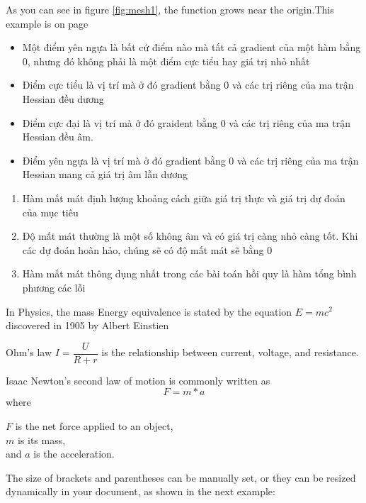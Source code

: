 \documentclass[12pt, letterpaper]{article}
\begin{document}
\newpage 
As you can see in figure \ref{fig:mesh1}, the function grows near the origin.This example is on page \pageref{fig:mesh1}   
    

\begin{itemize}
    \item Một điểm yên ngựa là bất cứ điểm nào mà tất cả gradient của một hàm bằng 0, nhưng đó không phải là một điểm cực tiểu hay giá trị nhỏ nhất
    \item Điểm cực tiểu là vị trí mà ở đó gradient bằng 0 và các trị riêng của ma trận Hessian đều dương
    \item Điểm cực đại là vị trí mà ở đó graident bằng 0 và các trị riêng của ma trận Hessian đều âm.
    \item Điểm yên ngựa là vị trí mà ở đó gradient bằng 0 và các trị riêng của ma trận Hessian mang cả giá trị âm lẫn dương


\end{itemize}

\begin{enumerate}
    \item Hàm mất mát định lượng khoảng cách giữa giá trị thực và giá trị dự đoán của mục tiêu
    \item  Độ mất mát thường là một số không âm và có giá trị càng nhỏ càng tốt. Khi các dự đoán hoàn hảo, chúng sẽ có độ mất mát sẽ bằng 0
    \item Hàm mất mát thông dụng nhất trong các bài toán hồi quy là hàm tổng bình phương các lỗi
\end{enumerate}

\newpage
In Physics, the mass Energy equivalence is stated by the equation $E=mc^2$ discovered in 1905 by Albert Einstien

\bigskip 


Ohm's law $ I = \dfrac{U}{R + r}$ is the relationship between current, voltage, and resistance.



\bigskip
Isaac Newton’s second law of motion is commonly written as 
\[ F=m*a\] where 

\begin{flushleft}
\(F\) is the net force applied to an object,\\
\(m\) is its mass,\\
and \(a\) is the acceleration.
\end{flushleft}

The size of brackets and parentheses can be manually set, or they can be resized dynamically in your document, as shown in the next example:
\end{document}

